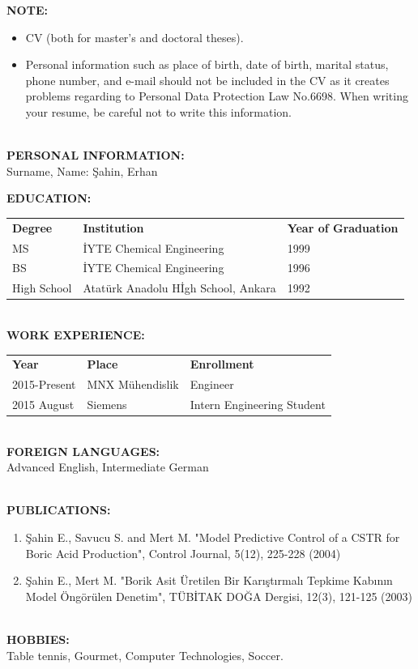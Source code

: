 \noindent\textbf{NOTE:}
\begin{itemize}
	\item CV (both for master's and doctoral theses).
	\item Personal information such as place of birth, date of birth, marital status, phone number, and e-mail should not be included in the CV as it creates problems regarding to Personal Data Protection Law No.6698. When writing your resume, be careful not to write this information.
\end{itemize}

~\\
\noindent\textbf{PERSONAL INFORMATION:}\\
Surname, Name: Şahin, Erhan

\noindent\textbf{EDUCATION:}\\
\begin{tabular}{lll}
	\textbf{Degree} & \textbf{Institution} & \textbf{Year of Graduation}\\
	MS & İYTE Chemical Engineering & 1999 \\
	BS & İYTE Chemical Engineering & 1996 \\
	High School & Atatürk Anadolu Hİgh School, Ankara & 1992
\end{tabular}

~\\
\textbf{WORK EXPERIENCE:}\\
\begin{tabular}{lll}
	\textbf{Year} & \textbf{Place} & \textbf{Enrollment} \\
	2015-Present & MNX Mühendislik & Engineer \\
	2015 August & Siemens & Intern Engineering Student
\end{tabular}

~\\
\textbf{FOREIGN LANGUAGES:}\\
Advanced English, Intermediate German

~\\
\textbf{PUBLICATIONS:}
\begin{enumerate}
	\item Şahin E., Savucu S. and Mert M. "Model Predictive Control of a CSTR for Boric Acid Production", Control Journal, 5(12), 225-228 (2004)
	\item Şahin E., Mert M. "Borik Asit Üretilen Bir Karıştırmalı Tepkime Kabının Model Öngörülen Denetim", TÜBİTAK DOĞA Dergisi, 12(3), 121-125 (2003)
\end{enumerate}

~\\
\textbf{HOBBIES:}\\
Table tennis, Gourmet, Computer Technologies, Soccer.